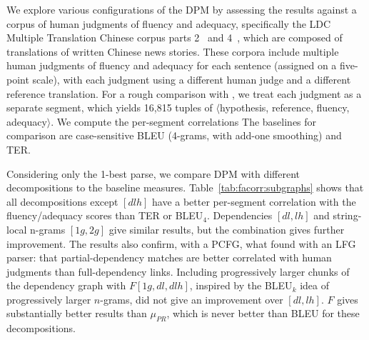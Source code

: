 \documentclass{kluwer}    %
\begin{document}
\begin{article}
We explore various configurations of the DPM by assessing the results
against a corpus of human judgments of fluency and adequacy,
specifically the LDC Multiple Translation Chinese corpus parts
2~\cite{LDC03MTC2} and 4~\cite{LDC06MTC4}, which are composed of
translations of written Chinese news stories.  These corpora include
multiple human judgments of fluency and adequacy for each sentence
(assigned on a five-point scale), with each judgment using a different
human judge and a different reference translation.  For a
rough comparison with
, we treat each judgment as a
separate segment, which yields 16,815 tuples of $\langle$hypothesis,
reference, fluency, adequacy$\rangle$.  We compute the per-segment
correlations
%
The baselines for comparison are case-sensitive BLEU (4-grams, with add-one smoothing) and TER. 

Considering only the 1-best parse, we compare DPM with different
decompositions to the baseline measures.
Table~\ref{tab:facorr:subgraphs} shows that all decompositions except
$[dlh]$ have a better per-segment correlation with the
fluency/adequacy scores than TER or BLEU$_4$. Dependencies $[dl,lh]$
and string-local n-grams $[1g,2g]$ give similar results, but the
combination gives further improvement.  The results also confirm, with
a PCFG, what  found with an LFG
parser: that partial-dependency matches are better correlated with
human judgments than full-dependency links. Including progressively
larger chunks of the dependency graph with $F[1g,dl,dlh]$, inspired by
the BLEU$_k$ idea of progressively larger $n$-grams, did not give an
improvement over $[dl,lh]$.  $F$ gives substantially better results than
$\mu_{PR}$, which is never better than BLEU for these decompositions.


\end{article}
\end{document}
